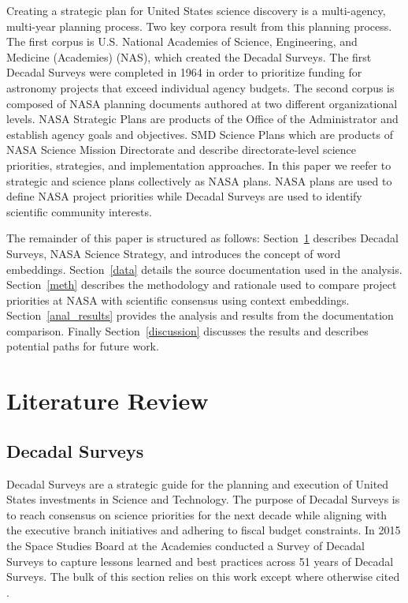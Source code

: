 \documentclass[preprint,12pt,doubleblind]{elsarticle}
\begin{document}
Creating a strategic plan for United States science discovery is a multi-agency, multi-year planning process. Two key corpora result from this planning process. The first corpus is U.S. National Academies of Science, Engineering, and Medicine (Academies) (NAS), which created the Decadal Surveys. The first Decadal Surveys were completed in 1964 in order to prioritize funding for astronomy projects that exceed individual agency budgets\cite{Academies2015_lessons}. The second corpus is composed of NASA planning documents authored at two different organizational levels. NASA Strategic Plans are products of the Office of the Administrator and establish agency goals and objectives\cite{WhiteHouse2021_space_priorities_framework}. SMD Science Plans which are products of NASA Science Mission Directorate and describe directorate-level science priorities, strategies, and implementation approaches.\cite{SMD_2025} In this paper we reefer to strategic and science plans collectively as NASA plans. NASA plans are used to define NASA project priorities while Decadal Surveys are used to identify scientific community interests.


The remainder of this paper is structured as follows: Section~\ref{lit} describes Decadal Surveys, NASA Science Strategy, and introduces the concept of word embeddings. Section~\ref{data} details the source documentation used in the analysis. Section~\ref{meth} describes the methodology and rationale used to compare project priorities at NASA with scientific consensus using context embeddings.  Section~\ref{anal_results} provides the analysis and results from the documentation comparison. Finally Section~\ref{discussion} discusses the results and describes potential paths for future work. 

\section{Literature Review}
\label{lit}
\subsection{Decadal Surveys}

Decadal Surveys are a strategic guide for the planning and execution of United States investments in Science and Technology\cite{Academies2015_lessons}. The purpose of Decadal Surveys is to reach consensus on science priorities for the next decade while aligning with the executive branch initiatives and adhering to fiscal budget constraints. In 2015 the Space Studies Board at the Academies conducted a Survey of Decadal Surveys to capture lessons learned and best practices across 51 years of Decadal Surveys. The bulk of this section relies on this work except where otherwise cited \cite{Academies2015_lessons}.
\end{document}
